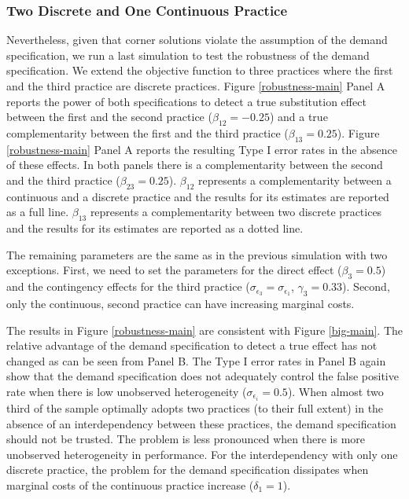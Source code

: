 \documentclass[12pt]{article}
\begin{document}
\subsubsection{Two Discrete and One Continuous Practice}



Nevertheless, given that corner solutions violate the assumption of the demand specification, we run a last simulation to test the robustness of the demand specification. We extend the objective function to three practices where the first and the third practice are discrete practices. Figure \ref{robustness-main} Panel A reports the power of both specifications to detect a true substitution effect between the first and the second practice ($\beta_{12} = -0.25$) and a true complementarity between the first and the third practice ($\beta_{13} = 0.25$). Figure \ref{robustness-main} Panel A reports the resulting Type I error rates in the absence of these effects. In both panels there is a complementarity between the second and the third practice ($\beta_{23} = 0.25$). $\beta_{12}$ represents a complementarity between a continuous and a discrete practice and the results for its estimates are reported as a full line. $\beta_{13}$ represents a complementarity between two discrete practices and the results for its estimates are reported as a dotted line.

The remaining parameters are the same as in the previous simulation with two exceptions. First, we need to set the parameters for the direct effect ($\beta_3 = 0.5$) and the contingency effects for the third practice ($\sigma_{\epsilon_3} = \sigma_{\epsilon_1}$, $\gamma_3 = 0.33$). Second, only the continuous, second practice can have increasing marginal costs. 

The results in Figure \ref{robustness-main} are consistent with Figure \ref{big-main}. The relative advantage of the demand specification to detect a true effect has not changed as can be seen from Panel B. The Type I error rates in Panel B again show that the demand specification does not adequately control the false positive rate when there is low unobserved heterogeneity ($\sigma_{\epsilon_i} = 0.5$). When almost two third of the sample optimally adopts two practices (to their full extent) in the absence of an interdependency between these practices, the demand specification should not be trusted. The problem is less pronounced when there is more unobserved heterogeneity in performance. For the interdependency with only one discrete practice, the problem for the demand specification dissipates when marginal costs of the continuous practice increase ($\delta_1 = 1$). 
\end{document}
